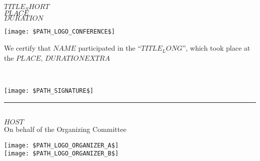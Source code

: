 \documentclass[12pt,landscape]{article}
\begin{document}

\begin{center}
{ \sc \color{customcolor} $TITLE_SHORT$}\\[5pt]
{ \sc $PLACE$}\\
{ \sc $DURATION$}\\
\end{center}

\begin{center}
\texttt{[image: \$PATH\_LOGO\_CONFERENCE\$]}
\end{center}


\begin{center}
\begin{minipage}{0.7\textwidth}
We certify that $NAME$ participated in the ``$TITLE_LONG$'', which took place at the $PLACE$,
$DURATION$$EXTRA$
\end{minipage}
\end{center}

\begin{center}
\begin{minipage}{0.15\textwidth}
~
\end{minipage}
\begin{minipage}{0.4\textwidth}
\hskip 20pt\texttt{[image: \$PATH\_SIGNATURE\$]}\\
\rule{8cm}{1pt}\\[5pt]
$HOST$\\
On behalf of the Organizing Committee
\end{minipage}
\begin{minipage}{0.4\textwidth}
\texttt{[image: \$PATH\_LOGO\_ORGANIZER\_A\$]}\\
\texttt{[image: \$PATH\_LOGO\_ORGANIZER\_B\$]}
\end{minipage}
\end{center}
\end{document}

